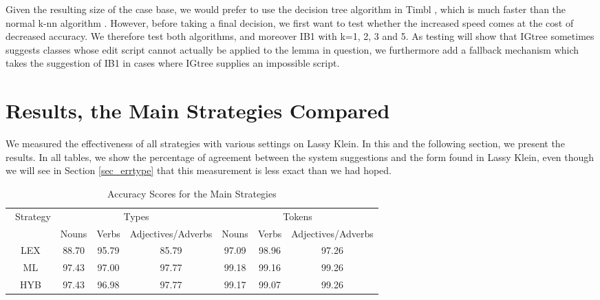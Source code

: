 \documentclass[a4paper,10pt,twoside]{article}
\begin{document}
Given the resulting size of the case base, we would prefer to use the decision tree algorithm in Timbl , which is much faster than the normal k-nn algorithm . However, before taking a final decision, we first want to test whether the increased speed comes at the cost of decreased accuracy. We therefore test both algorithms, and moreover IB1 with k=1, 2, 3 and 5. As testing will show that IGtree sometimes suggests classes whose edit script cannot actually be applied to the lemma in question, we furthermore add a fallback mechanism which takes the suggestion of IB1 in cases where IGtree supplies an impossible script.





\section{Results, the Main Strategies Compared}
\label{sec_results_main}
We measured the effectiveness of all strategies with various settings on Lassy Klein. In this and the following section, we present the results. In all  tables, we show the percentage of agreement between the system suggestions and the form found in Lassy Klein, even though we will see in Section \ref{sec_errtype} that this measurement is less exact than we had hoped.

\begin{table}[tbh]
\begin{center}
\begin{tabular}{|c|ccc|ccc|}
\hline
 Strategy & \multicolumn{3}{|c|}{Types} & \multicolumn{3}{|c|}{Tokens} \\ 
& Nouns & Verbs & Adjectives/Adverbs & Nouns & Verbs & Adjectives/Adverbs \\ 
\hline
LEX & 88.70 & 95.79 & 85.79 & 97.09 & 98.96 & 97.26 \\
ML & 97.43 & 97.00 & 97.77 & 99.18 & 99.16 & 99.26 \\
HYB & 97.43 & 96.98 & 97.77 & 99.17 & 99.07 & 99.26 \\

\hline
\end{tabular}
\caption{Accuracy Scores for the Main Strategies}
\label{tab_results_main}
\end{center}
\end{table}
\end{document}
